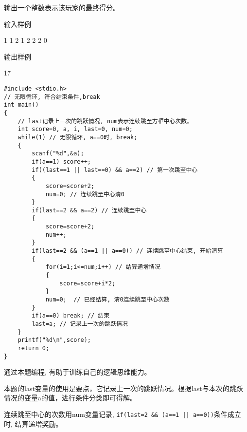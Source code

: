 输出一个整数表示该玩家的最终得分。

输入样例	

1 1 2 1 2 2 2 0

输出样例
	
17

\begin{lstlisting}
#include <stdio.h>
// 无限循环, 符合结束条件,break
int main()
{
	// last记录上一次的跳跃情况, num表示连续跳至方框中心次数。
	int score=0, a, i, last=0, num=0; 
	while(1) // 无限循环, a==0时, break;
	{
		scanf("%d",&a);
		if(a==1) score++; 
		if((last==1 || last==0) && a==2) // 第一次跳至中心 
		{
			score=score+2; 
		    num=0; // 连续跳至中心清0
		} 
		if(last==2 && a==2) // 连续跳至中心
		{ 
			score=score+2; 
			num++;
		}  
		if(last==2 && (a==1 || a==0)) // 连续跳至中心结束, 开始清算
		{ 
			for(i=1;i<=num;i++) // 结算递增情况 
			{
				score=score+i*2;
			}
			num=0;  // 已经结算, 清0连续跳至中心次数
		} 
		if(a==0) break; // 结束
		last=a; // 记录上一次的跳跃情况
	}
	printf("%d\n",score);	
	return 0;
} 
\end{lstlisting}

\begin{note}[要点]
	通过本题编程, 有助于训练自己的逻辑思维能力。
	
	本题的last变量的使用是要点，它记录上一次的跳跃情况。根据last与本次的跳跃情况的变量a的值，进行条件分类即可得解。
	
	连续跳至中心的次数用num变量记录, \lstinline$if(last=2 && (a==1 || a==0))$条件成立时, 结算递增奖励。
\end{note}


